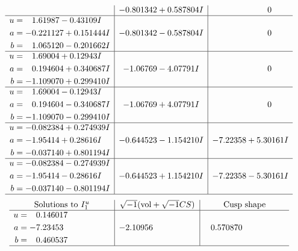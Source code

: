 \documentclass[1p]{elsarticle_modified}
\theoremstyle{definition}
\newcommand{\I}{\sqrt{-1}}
\begin{document}
$$\begin{array}{c|c|c}
 & -0.801342 + 0.587804 I & \phantom{-0.000000 } 0 \\ \hline\begin{aligned}
u &= \phantom{-}1.61987 - 0.43109 I \\
a &= -0.221127 + 0.151444 I \\
b &= \phantom{-}1.065120 - 0.201662 I\end{aligned}
 & -0.801342 - 0.587804 I & \phantom{-0.000000 } 0 \\ \hline\begin{aligned}
u &= \phantom{-}1.69004 + 0.12943 I \\
a &= \phantom{-}0.194604 + 0.340687 I \\
b &= -1.109070 + 0.299410 I\end{aligned}
 & -1.06769 - 4.07791 I & \phantom{-0.000000 } 0 \\ \hline\begin{aligned}
u &= \phantom{-}1.69004 - 0.12943 I \\
a &= \phantom{-}0.194604 - 0.340687 I \\
b &= -1.109070 - 0.299410 I\end{aligned}
 & -1.06769 + 4.07791 I & \phantom{-0.000000 } 0 \\ \hline\begin{aligned}
u &= -0.082384 + 0.274939 I \\
a &= -1.95414 + 0.28616 I \\
b &= -0.037140 + 0.801194 I\end{aligned}
 & -0.644523 - 1.154210 I & -7.22358 + 5.30161 I \\ \hline\begin{aligned}
u &= -0.082384 - 0.274939 I \\
a &= -1.95414 - 0.28616 I \\
b &= -0.037140 - 0.801194 I\end{aligned}
 & -0.644523 + 1.154210 I & -7.22358 - 5.30161 I\\
 \hline 
 \end{array}$$\newpage$$\begin{array}{c|c|c}  
\text{Solutions to }I^u_{1}& \I (\text{vol} + \sqrt{-1}CS) & \text{Cusp shape}\\
 \hline 
\begin{aligned}
u &= \phantom{-}0.146017\phantom{ +0.000000I} \\
a &= -7.23453\phantom{ +0.000000I} \\
b &= \phantom{-}0.460537\phantom{ +0.000000I}\end{aligned}
 & -2.10956\phantom{ +0.000000I} & \phantom{-}0.570870\phantom{ +0.000000I}\\
 \hline 
 \end{array}$$\newpage\newpage\renewcommand{\arraystretch}{1}
\end{document}
